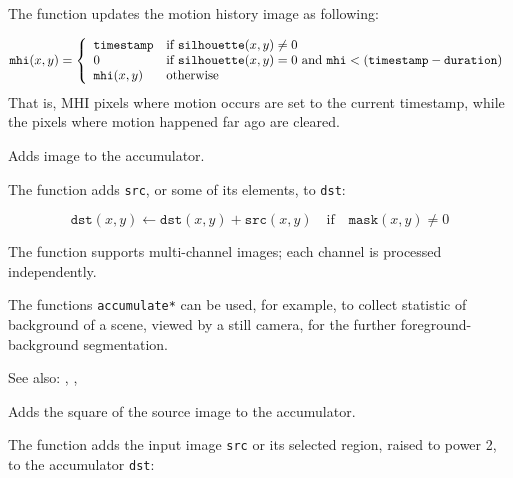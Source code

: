 The function updates the motion history image as following:

\[
\texttt{mhi}(x,y)=\left\{ \begin{array}{l l} \texttt{timestamp} & \mbox{if $\texttt{silhouette}(x,y) \ne 0$}\\ 0 & \mbox{if $\texttt{silhouette}(x,y) = 0$ and $\texttt{mhi} < (\texttt{timestamp} - \texttt{duration})$}\\ \texttt{mhi}(x,y) & \mbox{otherwise}\\ \end{array} \right.
\]
That is, MHI pixels where motion occurs are set to the current timestamp, while the pixels where motion happened far ago are cleared.

\fi

\ifCpp

Adds image to the accumulator.

\begin{description}
\end{description}

The function adds \texttt{src}, or some of its elements, to \texttt{dst}:

\[ \texttt{dst}(x,y) \leftarrow \texttt{dst}(x,y) + \texttt{src}(x,y) \quad \text{if} \quad \texttt{mask}(x,y) \ne 0 \]

The function supports multi-channel images; each channel is processed independently.

The functions \texttt{accumulate*} can be used, for example, to collect statistic of background of a scene, viewed by a still camera, for the further foreground-background segmentation.

See also: , , 

Adds the square of the source image to the accumulator.

\begin{description}
\end{description}

The function adds the input image \texttt{src} or its selected region, raised to power 2, to the accumulator \texttt{dst}:

